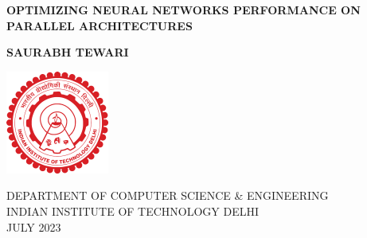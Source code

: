 \begin{titlepage}

\begin{center}


\LARGE 

\MakeUppercase{\textbf{OPTIMIZING NEURAL NETWORKS PERFORMANCE ON PARALLEL ARCHITECTURES}}\\

\vspace{3cm}

\LARGE

\textbf{SAURABH TEWARI} 

\vspace{6cm}
\hspace{0cm}
\hbox{\includegraphics[width=8pc]{ThesisSpecificPages/iitd-logo.pdf}}
\vspace{1cm}

\large{DEPARTMENT OF COMPUTER SCIENCE \& ENGINEERING}\\
\large{INDIAN INSTITUTE OF TECHNOLOGY DELHI}\\
\large{JULY 2023}\\

\end{center}

\end{titlepage}
